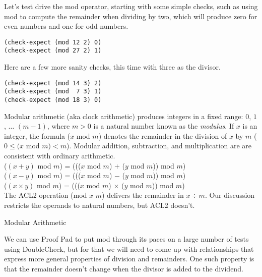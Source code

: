 Let's test drive the \textsf{mod} operator, starting with
some simple checks, such as using \textsf{mod}
to compute the remainder when dividing by two,
which will produce zero for even numbers and one for odd numbers.

\begin{Verbatim}
(check-expect (mod 12 2) 0)
(check-expect (mod 27 2) 1)
\end{Verbatim}

Here are a few more sanity checks, this time with three as the divisor.

\begin{Verbatim}
(check-expect (mod 14 3) 2)
(check-expect (mod  7 3) 1)
(check-expect (mod 18 3) 0)
\end{Verbatim}

\begin{aside}
Modular
arithmetic (aka clock arithmetic)
produces integers in a fixed range: $0$, $1$, $\dots$ $(m - 1)$,
where $m > 0$ is a natural number known as the 
\emph{modulus}.
If $x$ is an integer, the formula ($x$ mod $m$) denotes
the remainder in the division of $x$ by $m$ 
($0 \leq (x$ mod $m) < m$).
Modular addition, subtraction, and multiplication are
are consistent with ordinary arithmetic.\\
\hspace*{15mm}($(x + y)$ mod $m$) = ((($x$ mod $m$) $+$ ($y$ mod $m$)) mod $m$) \\
\hspace*{15mm}($(x - y)$ mod $m$) = ((($x$ mod $m$) $-$ ($y$ mod $m$)) mod $m$) \\
\hspace*{15mm}($(x \times y)$ mod $m$) = ((($x$ mod $m$) $\times$ ($y$ mod $m$)) mod $m$)\\
The ACL2 operation  
(\textsf{mod} $x$ $m$) delivers the remainder in $x \div m$.
Our discussion restricts the operands to natural numbers,
but ACL2 doesn't.
\caption{Modular Arithmetic}
\label{modular-arithmetic}
\end{aside}

We can use Proof Pad to put \textsf{mod}
through its paces on a large number of tests using DoubleCheck,
but for that we will need to come up with relationships
that express more general properties of division and remainders.
One such property is that the remainder doesn't change
when the divisor is added to the dividend.

